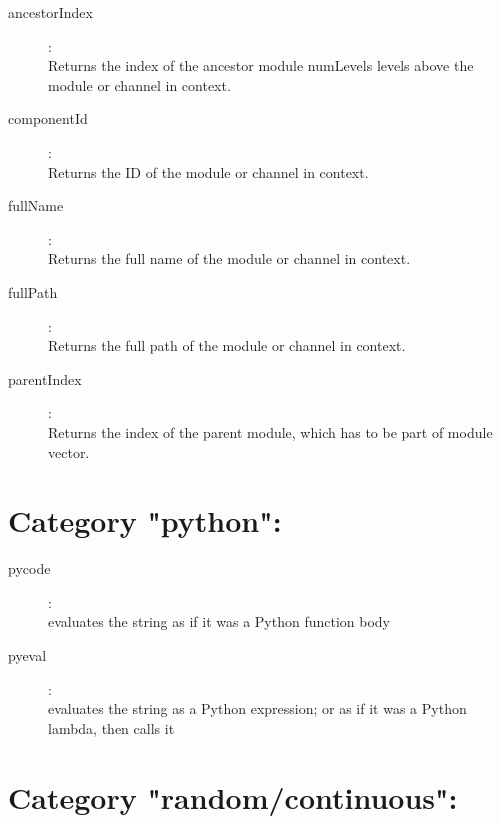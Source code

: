 \begin{description}
\item[ancestorIndex]:  \\
    Returns the index of the ancestor module numLevels levels above the module
    or channel in context.

\item[componentId]:  \\
    Returns the ID of the module or channel in context.

\item[fullName]:  \\
    Returns the full name of the module or channel in context.

\item[fullPath]:  \\
    Returns the full path of the module or channel in context.

\item[parentIndex]:  \\
    Returns the index of the parent module, which has to be part of module
    vector.


\end{description}

\section{Category "python":}
\label{sec:ned-functions:category-python}

\begin{description}
\item[pycode]:  \\
    evaluates the string as if it was a Python function body

\item[pyeval]:  \\
    evaluates the string as a Python expression; or as if it was a Python
    lambda, then calls it


\end{description}

\section{Category "random/continuous":}
\label{sec:ned-functions:category-random-continuous}

